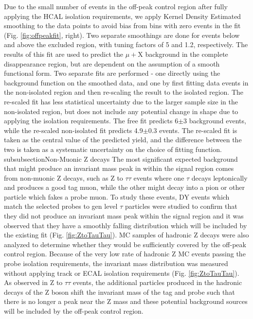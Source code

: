 Due to the small number of events in the off-peak control region after fully applying the HCAL isolation requirements, we apply Kernel Density Estimated smoothing to the data points to avoid bias from bins with zero events in the fit (Fig. \ref{fig:offpeakfit}, right). Two separate smoothings are done for events below and above the excluded region, with tuning factors of 5 and 1.2, respectively. The results of this fit are used to predict the $\mu+$X background in the complete disappearance region, but are dependent on the assumption of a smooth functional form. Two separate fits are performed - one directly using the background function on the smoothed data, and one by first fitting data events in the non-isolated region and then re-scaling the result to the isolated region. The re-scaled fit has less statistical uncertainty due to the larger sample size in the non-isolated region, but does not include any potential change in shape due to applying the isolation requirements. The free fit predicts 6$\pm$3 background events, while the re-scaled non-isolated fit predicts 4.9$\pm$0.3 events. The re-scaled fit is taken as the central value of the predicted yield, and the difference between the two is taken as a systematic uncertainty on the choice of fitting function.
subsubsection{Non-Muonic Z decays}
The most significant expected background that might produce an invariant mass peak in within the signal region comes from non-muonic Z decays, such as Z to $\tau\tau$ events where one $\tau$ decays leptonically and produces a good tag muon, while the other might decay into a pion or other particle which fakes a probe muon. To study these events, DY events which match the selected probes to gen level $\tau$ particles were studied to confirm that they did not produce an invariant mass peak within the signal region and it was observed that they have a smoothly falling distribution which will be included by the existing fit (Fig. \ref{fig:ZtoTauTau}).
MC samples of hadronic Z decays were also analyzed to determine whether they would be sufficiently covered by the off-peak control region. Because of the very low rate of hadronic Z MC events passing the probe isolation requirements, the invariant mass distribution was measured without applying track or ECAL isolation requirements (Fig. \ref{fig:ZtoTauTau}). As observed in Z to $\tau\tau$ events, the additional particles produced in the hadronic decays of the Z boson shift the invariant mass of the tag and probe such that there is no longer a peak near the Z mass and these potential background sources will be included by the off-peak control region.

